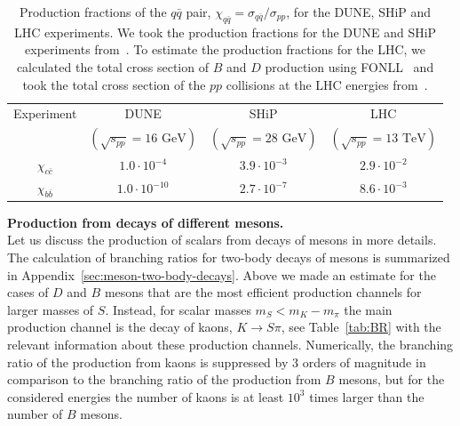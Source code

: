 \documentclass[a4paper,12pt,dvipsnames,usernames]{article}
\begin{document}
\begin{table}[t]
\centering
\begin{tabular}{|c|c|c|c|}
 \hline  
 Experiment  & DUNE & SHiP & LHC \\
 & $(\sqrt{s_{pp}} = 16\text{ GeV})$ & $(\sqrt{s_{pp}} = 28\text{ GeV})$ & $(\sqrt{s_{pp}} = 13\text{ TeV})$\\
 \hline
 $\chi_{c\bar{c}}$ & $1.0\cdot 10^{-4}$ & $3.9\cdot 10^{-3}$  & $2.9\cdot 10^{-2}$ \\
 \hline
 $\chi_{b\bar{b}}$ & $1.0\cdot 10^{-10}$ & $2.7\cdot 10^{-7}$ & $8.6 \cdot 10^{-3}$\\
 \hline
\end{tabular}
    \caption{Production fractions of the $q\bar{q}$ pair, $\chi_{q\bar{q}} = \sigma_{q\bar{q}}/\sigma_{pp}$, for the DUNE, SHiP and LHC experiments. We took the production fractions for the DUNE and SHiP experiments from~\cite{Lourenco:2006vw,CERN-SHiP-NOTE-2015-009}. To estimate the production fractions for the LHC, we calculated the total cross section of $B$ and $D$ production using FONLL~\cite{Cacciari:1998it} and took the total cross section of the $pp$ collisions at the LHC energies from~\cite{Tanabashi:2018oca}.}
    \label{tab:meson-amounts}
\end{table}




\textbf{Production from decays of different mesons.}\\
Let us discuss the production of scalars from decays of mesons in more details.
The calculation of branching ratios for two-body decays of mesons is summarized in  Appendix~\ref{sec:meson-two-body-decays}. Above we made an estimate for the cases of $D$ and $B$ mesons that are the most efficient production channels for larger masses of $S$. 
Instead, for scalar masses $m_S<m_K-m_\pi$ the main production channel is the decay of kaons, $K \to S \pi$, see Table~\ref{tab:BR} with the relevant information about these production channels. Numerically, the branching ratio of the production from kaons is suppressed by 3 orders of magnitude in comparison to the branching ratio of the production from $B$ mesons, but for the considered energies the number of kaons is at least $10^{3}$ times larger than the number of $B$ mesons.
\end{document}
